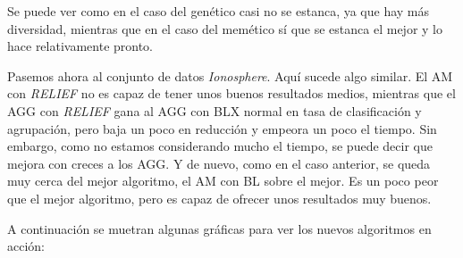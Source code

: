 \documentclass[11pt,a4paper]{article}
\begin{document}
Se puede ver como en el caso del genético casi no se estanca, ya que hay más diversidad, mientras que en el caso del memético
sí que se estanca el mejor y lo hace relativamente pronto.

Pasemos ahora al conjunto de datos \textit{Ionosphere}. Aquí sucede algo similar. El AM con \textit{RELIEF} no es capaz de
tener unos buenos resultados medios, mientras que el AGG con \textit{RELIEF} gana al AGG con BLX normal en tasa de clasificación
y agrupación, pero baja un poco en reducción y empeora un poco el tiempo. Sin embargo, como no estamos considerando mucho el
tiempo, se puede decir que mejora con creces a los AGG. Y de nuevo, como en el caso anterior, se queda muy cerca del mejor
algoritmo, el AM con BL sobre el mejor. Es un poco peor que el mejor algoritmo, pero es capaz de ofrecer unos resultados
muy buenos.

A continuación se muetran algunas gráficas para ver los nuevos algoritmos en acción:
\end{document}
